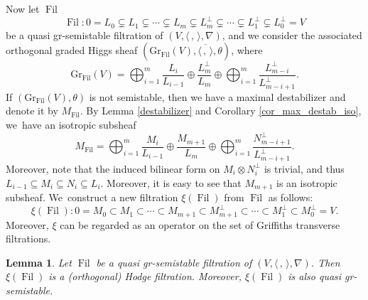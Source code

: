 \documentclass[JEP,XML,SOM,Unicode,published]{cedram}
\newcommand{\grsemistable}{gr\nobreakdash-semi\-stable\xspace}
\DeclareMathOperator{\Filt}{Fil}
\newcommand{\Gr}{\mathrm{Gr}}
\theoremstyle{plain}
\newtheorem{lem}[thm]{Lemma}
\theoremstyle{definition}
\begin{document}
Now let $\Filt$
\[
\Filt: 0= L_0 \subsetneq L_1 \subsetneq \cdots \subsetneq L_m \subsetneq L_m^\perp\subsetneq\cdots \subsetneq L_1^\perp\subsetneq L_0^\perp= V
\]
be a quasi \grsemistable filtration of $(V,\langle \,, \, \rangle,\nabla)$, and we consider the associated orthogonal graded Higgs sheaf $(\Gr_{\Filt}(V), \overline{\langle \,, \, \rangle},\theta)$, where
\[
\Gr_{\Filt}(V)=\mathop{\bigoplus}_{i=1}^{m} \frac{L_i}{L_{i-1}}\oplus \frac{L_m^\perp}{L_m}\oplus \mathop{\bigoplus}_{i=1}^{m} \frac{L_{m-i}^\perp}{L_{m-i+1}^\perp}.
\]
If $(\Gr_{\Filt}(V),\theta)$ is not semistable, then we have a maximal destabilizer and denote it by $M_{\Filt}$. By Lemma \ref{destabilizer} and Corollary \ref{cor_max_destab_iso}, we~have an isotropic subsheaf
\[
M_{\Filt}=\mathop{\bigoplus}_{i=1}^{m} \frac{M_i}{L_{i-1}}\oplus \frac{M_{m+1}}{L_m}\oplus \mathop{\bigoplus}_{i=1}^{m} \frac{N_{m-i+1}^\perp}{L_{m-i+1}^\perp}.
\]
Moreover, note that the induced bilinear form on $M_i \otimes N_i^{\perp}$ is trivial, and thus $L_{i-1} \subseteq M_i \subseteq N_i \subseteq L_i$. Moreover, it is easy to see that $M_{m+1}$ is an isotropic subsheaf. We~construct a new filtration $\xi(\Filt)$ from $\Filt$ as follows:
\[
\xi(\Filt):0=M_0\subset M_1\subset\cdots\subset M_{m+1}\subset M_{m+1}^\perp\subset\cdots\subset M_1^\perp\subset M_0^\perp=V.
\]
Moreover, $\xi$ can be regarded as an operator on the set of Griffiths transverse filtrations.

\begin{lem}\label{preserve}
Let $\Filt$ be a quasi \grsemistable filtration of $(V, \langle \,, \, \rangle, \nabla)$. Then $\xi(\Filt)$ is a (orthogonal) Hodge filtration. Moreover, $\xi(\Filt)$ is also quasi \grsemistable.
\end{lem}
\end{document}
